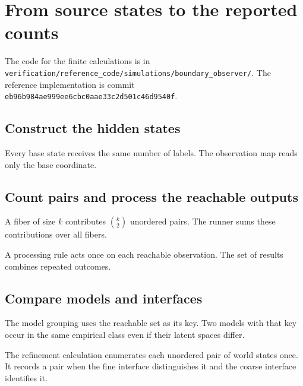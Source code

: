 \section{From source states to the reported counts}

The code for the finite calculations is in \nolinkurl{verification/reference_code/simulations/boundary_observer/}. The reference implementation is commit \nolinkurl{eb96b984ae999ee6cbc0aae33c2d501c46d9540f}.

\subsection{Construct the hidden states}
Every base state receives the same number of labels. The observation map reads only the base coordinate.


\subsection{Count pairs and process the reachable outputs}
A fiber of size \(k\) contributes \(\binom{k}{2}\) unordered pairs. The runner sums these contributions over all fibers.


A processing rule acts once on each reachable observation. The set of results combines repeated outcomes.


\subsection{Compare models and interfaces}
The model grouping uses the reachable set as its key. Two models with that key occur in the same empirical class even if their latent spaces differ.


The refinement calculation enumerates each unordered pair of world states once. It records a pair when the fine interface distinguishes it and the coarse interface identifies it.

